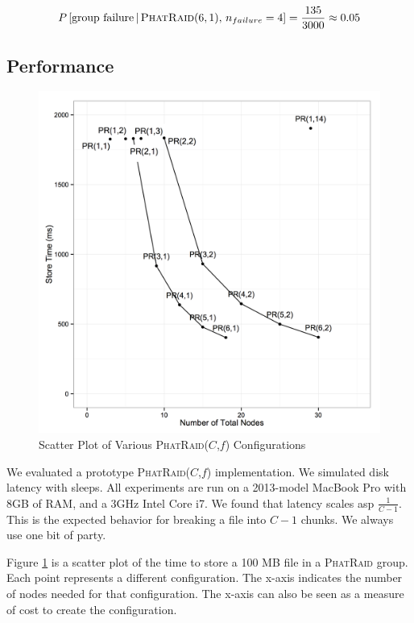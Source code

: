 \documentclass[10pt,letter]{article}
\newcommand{\phatraid}[0]{\textsc{PhatRaid}}
\newcommand{\phatraidcf}[2]{\textsc{PhatRaid}(#1,#2)}
\begin{document}
\begin{align*}
  P\left[\textrm{group failure} \,|\, \phatraidcf{6}{1},\, n_{failure}=4\right]
    = \frac{135}{3000} \approx 0.05
\end{align*}

\subsection{Performance}

\begin{figure}
  \centering
  \includegraphics[scale=0.5]{Store.png}
  \caption{Scatter Plot of Various \phatraidcf{$C$}{$f$} Configurations}
  \label{fig:plot}
\end{figure}

We evaluated a prototype \phatraidcf{$C$}{$f$} implementation. We simulated disk
latency with sleeps. All experiments are run on a 2013-model MacBook Pro with
8GB of RAM, and a 3GHz Intel Core i7. We found that latency scales asp
$\frac{1}{C-1}$. This is the expected behavior for breaking a file into $C-1$
chunks. We always use one bit of party.

Figure \ref{fig:plot} is a scatter plot of the time to store a 100 MB file in a
\phatraid{} group. Each point represents a different configuration. The x-axis
indicates the number of nodes needed for that configuration. The x-axis can also
be seen as a measure of cost to create the configuration.
\end{document}
